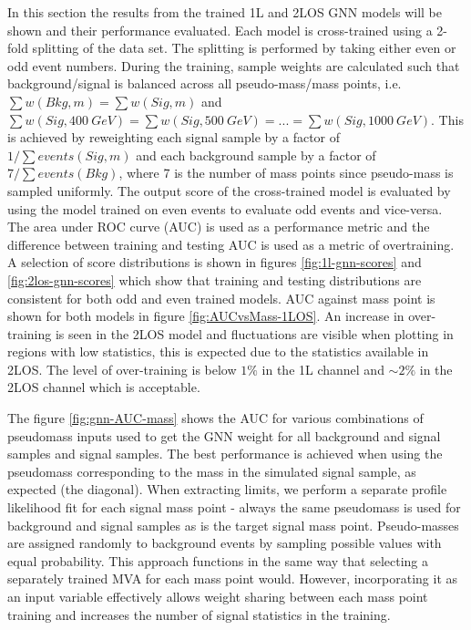 In this section the results from the trained 1L and 2LOS GNN models will be shown and their performance evaluated. Each model is cross-trained using a 2-fold splitting of the data set. The splitting is performed by taking either even or odd event numbers.
During the training, sample weights are calculated such that background/signal is balanced across all pseudo-mass/mass points, i.e.$\sum w(Bkg,m) = \sum w(Sig,m)$ and $\sum w(Sig,400~GeV)=\sum w(Sig,500~GeV)=...=\sum w(Sig,1000~GeV)$.
This is achieved by reweighting each signal sample by a factor of $1/\sum events(Sig,m)$ and each background sample by a factor of $7/\sum events(Bkg)$, where 7 is the number of mass points since pseudo-mass is sampled uniformly.
The output score of the cross-trained model is evaluated by using the model trained on even events to evaluate odd events and vice-versa. The area under ROC curve (AUC) is used as a performance metric and the difference between training and testing AUC is used as a metric of overtraining. A selection of score distributions is shown in figures \ref{fig:1l-gnn-scores} and \ref{fig:2los-gnn-scores} which show that training and testing distributions are consistent for both odd and even trained models. AUC against mass point is shown for both models in figure \ref{fig:AUCvsMass-1LOS}. An increase in over-training is seen in the 2LOS model and fluctuations are visible when plotting in regions with low statistics, this is expected due to the statistics available in 2LOS. The level of over-training is below $1\%$ in the 1L channel and $\sim2\%$ in the 2LOS channel which is acceptable.

The figure \ref{fig:gnn-AUC-mass} shows the AUC for various combinations of pseudomass inputs used to get the GNN weight for all background and signal samples and signal samples. The best performance is achieved when using the pseudomass corresponding to the mass in the simulated signal sample, as expected (the diagonal). When extracting limits, we perform a separate profile likelihood fit for each signal mass point - always the same pseudomass is used for background and signal samples as is the target signal mass point. Pseudo-masses are assigned randomly to background events by sampling possible values with equal probability. This approach functions in the same way that selecting a separately trained MVA for each mass point would. However, incorporating it as an input variable effectively allows weight sharing between each mass point training and increases the number of signal statistics in the training.

